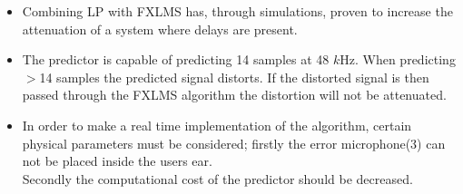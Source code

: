 \large
\begin{itemize}
\item Combining LP with FXLMS has, through simulations, proven to increase the attenuation of a system where delays are present. \\
\item The predictor is capable of predicting 14 samples at 48 $k$Hz. When predicting $>$14 samples the predicted signal distorts. If the distorted signal is then passed through the FXLMS algorithm the distortion will not be attenuated.\\
\item In order to make a real time implementation of the algorithm, certain physical parameters must be considered; firstly the error microphone(3) can not be placed inside the users ear. \\ Secondly the computational cost of the predictor should be decreased.
\end{itemize}
